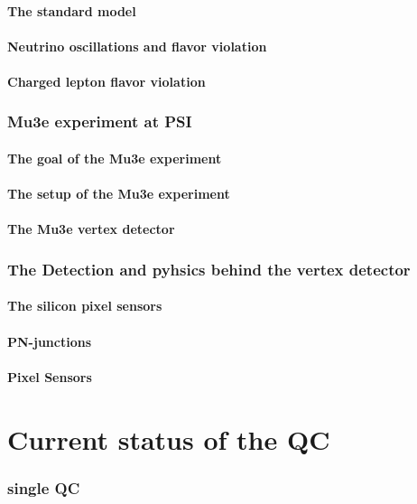 \documentclass[a4paper, 12pt]{article}
\begin{document}
\subsection{The standard model}
\subsection{Neutrino oscillations and flavor violation}
\subsection{Charged lepton flavor violation}

\section{Mu3e experiment at PSI}
\subsection{The goal of the Mu3e experiment}
\subsection{The setup of the Mu3e experiment}
\subsection{The Mu3e vertex detector}

\section{The Detection and pyhsics behind the vertex detector}
\subsection{The silicon pixel sensors}
\subsection{PN-junctions}
\subsection{Pixel Sensors}

\part{Current status of the QC}
\section{single QC}
\end{document}
